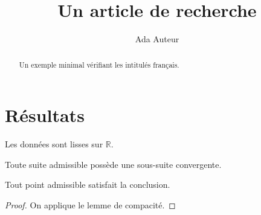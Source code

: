 \documentclass[11pt]{ocots-paper}
\title{Un article de recherche}
\author{Ada Auteur}
\newcommand{\R}{\mathbb{R}}
\begin{document}
\begin{abstract}
Un exemple minimal vérifiant les intitulés français.
\end{abstract}
\maketitle

\section{Résultats}

\begin{hypothesis}[Régularité]
Les données sont lisses sur $\R$.
\end{hypothesis}

\begin{lemma}[Compacité]
Toute suite admissible possède une sous-suite convergente.
\end{lemma}

\begin{theorem}
Tout point admissible satisfait la conclusion.
\end{theorem}

\begin{proof}
On applique le lemme de compacité.
\end{proof}
\end{document}
